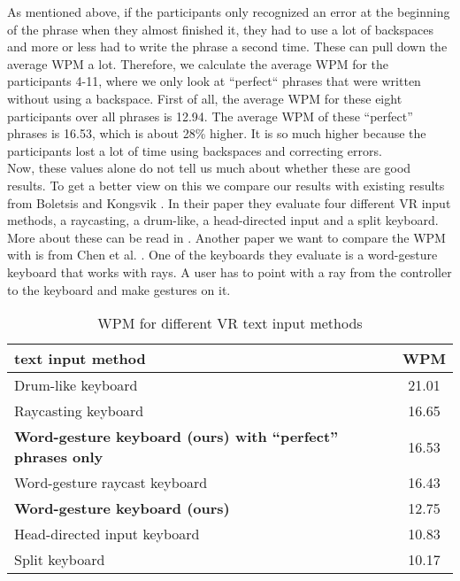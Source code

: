 As mentioned above, if the participants only recognized an error at the beginning of the phrase when they almost finished it, they had to use a lot of backspaces and more or less had to write the phrase a second time. These can pull down the average WPM a lot. Therefore, we calculate the average WPM for the participants 4-11, where we only look at ``perfect`` phrases that were written without using a backspace. First of all, the average WPM for these eight participants over all phrases is 12.94. The average WPM of these ``perfect'' phrases is 16.53, which is about 28\% higher. It is so much higher because the participants lost a lot of time using backspaces and correcting errors.\\

Now, these values alone do not tell us much about whether these are good results. To get a better view on this we compare our results with existing results from Boletsis and Kongsvik \cite{Boletsis2019ControllerbasedTT}. In their paper they evaluate four different VR input methods, a raycasting, a drum-like, a head-directed input and a split keyboard. More about these can be read in . Another paper we want to compare the WPM with is from Chen et al. \cite{10.1145/3290607.3312762}. One of the keyboards they evaluate is a word-gesture keyboard that works with rays. A user has to point with a ray from the controller to the keyboard and make gestures on it.
\begin{table}[ht!]
    \centering
    \caption{WPM for different VR text input methods}
    \begin{tabular}{lc} \toprule
        text input method&WPM\\ \midrule
        Drum-like keyboard& 21.01\\
        Raycasting keyboard& 16.65\\
        \textbf{Word-gesture keyboard (ours) with ``perfect'' phrases only}&16.53\\
        Word-gesture raycast keyboard& 16.43\\
        \textbf{Word-gesture keyboard (ours)}& 12.75\\
        Head-directed input keyboard& 10.83\\
        Split keyboard& 10.17\\
        \bottomrule
    \end{tabular}
    \label{tab:wpm_compare}
\end{table}

